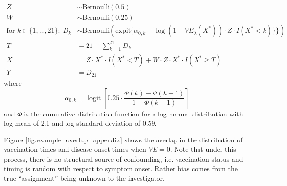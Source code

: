 \begin{appendices}
\begin{refsection}
\begin{align*}
        Z & \sim \text{Bernoulli}(0.5) \\
        W & \sim \text{Bernoulli}(0.25) \\
        \text{for } k \in \{1, \ldots, 21\}: \; D_k & \sim \text{Bernoulli}(\text{expit}\{\alpha_{0,k} + \log(1 - VE_{\lambda}(X^*)) \cdot Z \cdot I(X^* < k)\}\}) \\
        T &= 21 - \sum_{k=1}^{21} D_k \\
        X &= Z \cdot X^* \cdot I(X^* < T) + W \cdot Z \cdot X^* \cdot I(X^* \geq T) \\
        Y &= D_{21}
    \end{align*}
    where 
    $$\alpha_{0,k} = \operatorname{logit}\left[0.25 \cdot \frac{\Phi(k) - \Phi(k -1)}{1 - \Phi(k-1)}\right]$$
    and $\Phi$ is the cumulative distribution function for a log-normal distribution with log mean of 2.1 and log standard deviation of 0.59.
    
    Figure \ref{fig:example_overlap_appendix} shows the overlap in the distribution of vaccination times and disease onset times when $VE = 0$. Note that under this process, there is no structural source of confounding, i.e. vaccination status and timing is random with respect to symptom onset. Rather bias comes from the true ``assignment'' being unknown to the investigator.


\end{refsection}
\end{appendices}
